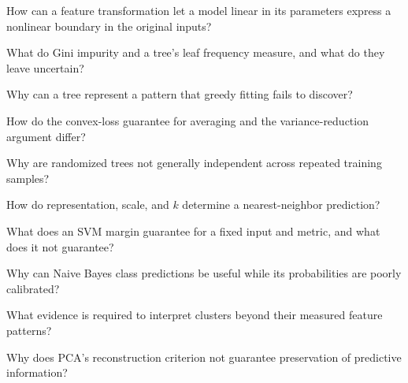 \begin{studyquestions}
\item How can a feature transformation let a model linear in its parameters express a nonlinear boundary in the original inputs?
\item What do Gini impurity and a tree's leaf frequency measure, and what do they leave uncertain?
\item Why can a tree represent a pattern that greedy fitting fails to discover?
\item How do the convex-loss guarantee for averaging and the variance-reduction argument differ?
\item Why are randomized trees not generally independent across repeated training samples?
\item How do representation, scale, and $k$ determine a nearest-neighbor prediction?
\item What does an SVM margin guarantee for a fixed input and metric, and what does it not guarantee?
\item Why can Naive Bayes class predictions be useful while its probabilities are poorly calibrated?
\item What evidence is required to interpret clusters beyond their measured feature patterns?
\item Why does PCA's reconstruction criterion not guarantee preservation of predictive information?
\end{studyquestions}

